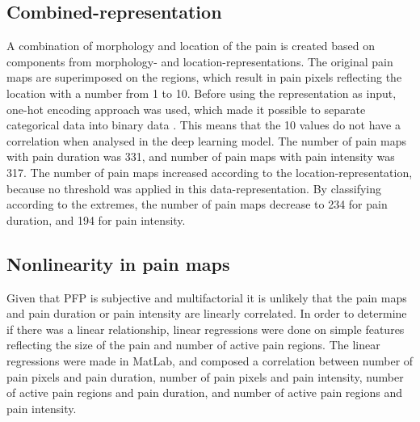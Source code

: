 \subsection*{\textbf{Combined-representation}} 
\noindent
A combination of morphology and location of the pain is created based on components from morphology- and location-representations. The original pain maps are superimposed on the regions, which result in pain pixels reflecting the location with a number from 1 to 10. Before using the representation as input, one-hot encoding approach was used, which made it possible to separate categorical data into binary data \citep{Harris2012}. This means that the 10 values do not have a correlation when analysed in the deep learning model. The number of pain maps with pain duration was 331, and number of pain maps with pain intensity was 317. The number of pain maps increased according to the location-representation, because no threshold was applied in this data-representation. By classifying according to the extremes, the number of pain maps decrease to 234 for pain duration, and 194 for pain intensity.

\subsection*{\textbf{Nonlinearity in pain maps}} 
\noindent
Given that PFP is subjective and multifactorial it is unlikely that the pain maps and pain duration or pain intensity are linearly correlated. In order to determine if there was a linear relationship, linear regressions were done on simple features reflecting the size of the pain and number of active pain regions. The linear regressions were made in MatLab, and composed a correlation between number of pain pixels and pain duration, number of pain pixels and pain intensity, number of active pain regions and pain duration, and number of active pain regions and pain intensity.


